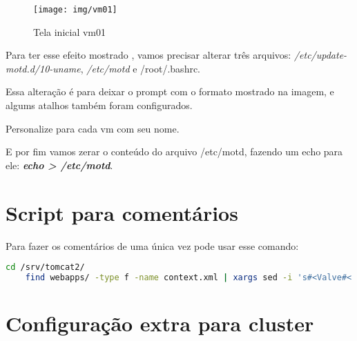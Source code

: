 \begin{figure}[H]
	\centering
	\caption[tela inicial vm01]{Tela inicial vm01}
	\texttt{[image: img/vm01]}
	\label{fig:vm01}
\end{figure}

Para ter esse efeito mostrado , vamos precisar alterar três arquivos:
	\emph{/etc/update-motd.d/10-uname}, \emph{/etc/motd} e /root/.bashrc.

Essa alteração é para deixar o prompt com o formato mostrado na imagem, e algums atalhos também foram configurados.


Personalize para cada vm com seu nome.


E por fim vamos zerar o conteúdo do arquivo /etc/motd, fazendo um echo para ele: \emph{\textbf{echo > /etc/motd}}.

\section{Script para comentários}

Para fazer os comentários de uma única vez pode usar esse comando:

\begin{lstlisting}[label=commentXml,language=bash,breaklines=true,basicstyle=\ttfamily,caption={Incluir comentários em arquivos context.xml}]
	cd /srv/tomcat2/ 
	find webapps/ -type f -name context.xml | xargs sed -i 's#<Valve#<!--<Valve#g;s#|0:0:0:0:0:0:0:1" />#"|0:0:0:0:0:0:0:1" />-->#g' 
\end{lstlisting}

\section{Configuração extra para cluster}



